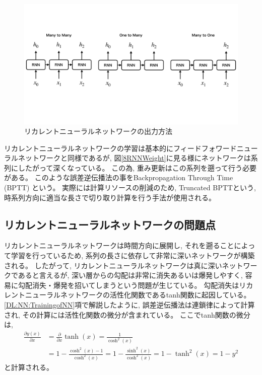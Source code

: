 \begin{figure}[htbp]
 \centering
 \includegraphics[trim = 0 200 0 200, width=1.0\textwidth, clip]{Figure/2DeepLearning/9RNNOutputs.png}
 \caption[リカレントニューラルネットワークの出力方法]{リカレントニューラルネットワークの出力方法}
 \label{9RNNOutputs}
\end{figure}

リカレントニューラルネットワークの学習は基本的にフィードフォワードニューラルネットワークと同様であるが, 図\ref{8RNNWeight}に見る様にネットワークは系列にしたがって深くなっている。
この為, 重み更新はこの系列を遡って行う必要がある。
このような誤差逆伝播法の事をBackpropagation Through Time (BPTT) という。
実際には計算リソースの削減のため, Truncated BPTTという, 時系列方向に適当な長さで切り取り計算を行う手法が使用される。


\subsection{リカレントニューラルネットワークの問題点} \label{DL:RNN:IssueofRNN}

リカレントニューラルネットワークは時間方向に展開し, それを遡ることによって学習を行っているため, 系列の長さに依存して非常に深いネットワークが構築される。
したがって, リカレントニューラルネットワークは真に深いネットワークであると言えるが, 深い層からの勾配は非常に消失あるいは爆発しやすく, 容易に勾配消失・爆発を招いてしまうという問題が生じている。
勾配消失はリカレントニューラルネットワークの活性化関数であるtanh関数に起因している。
\ref{DL:NN:TrainingofNN}項で解説したように, 誤差逆伝播法は連鎖律によって計算され, その計算には活性化関数の微分が含まれている。
ここでtanh関数の微分は, 
\begin{equation}
 \begin{split}
  \frac{\partial y(x)}{\partial x}
  &= \frac{\partial}{\partial x} \tanh(x) = \frac{1}{\cosh^2 (x)} \\
  &= 1 - \frac{\cosh^2 (x) - 1}{\cosh^2 (x)} = 1 - \frac{\sinh^2 (x)}{\cosh^2 (x)} = 1 - \tanh^2 (x) = 1 - y^2
 \end{split}
\end{equation}
と計算される。

